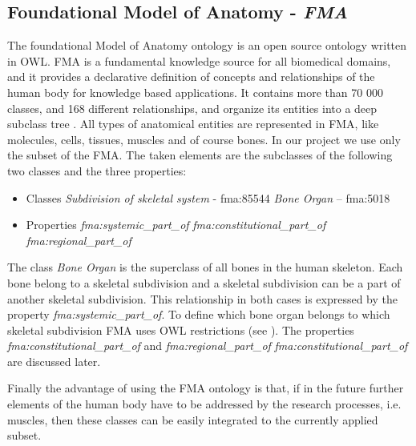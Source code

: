 \subsection{Foundational Model of Anatomy - \textit{FMA}} 

The foundational Model of Anatomy ontology is an open source ontology written in OWL. FMA is a fundamental knowledge source for all biomedical domains, and it provides a declarative definition of concepts and relationships of the human body for knowledge based applications. It contains more than 70 000 classes, and 168 different relationships, and organize its entities into a deep subclass tree \cite{Rosse2003478}. All types of anatomical entities are represented in FMA, like molecules, cells, tissues, muscles and of course bones. In our project we use only the subset of the FMA. The taken elements are the subclasses of the following two classes and the three properties: 

\begin{itemize}
	\item{Classes}
		\subitem \textit{Subdivision of skeletal system} - fma:85544 
		\subitem \textit{Bone Organ} – fma:5018
\end{itemize}

\begin{itemize}
	\item{Properties}
		\subitem \textit{fma:systemic\_part\_of}
		\subitem \textit{fma:constitutional\_part\_of}
		\subitem \textit{fma:regional\_part\_of}
\end{itemize}

The class \textit{Bone Organ} is the superclass of all bones in the human skeleton. Each bone belong to a skeletal subdivision and a skeletal subdivision can be a part of another skeletal subdivision. This relationship in both cases is expressed by the property \textit{fma:systemic\_part\_of}. To define which bone organ belongs to which skeletal subdivision FMA uses OWL restrictions (see ). The properties \textit{fma:constitutional\_part\_of} and \textit{fma:regional\_part\_of} \textit{fma:constitutional\_part\_of} are discussed later.


Finally the advantage of using the FMA ontology is that, if in the future further elements of the human body have to be addressed by the research processes, i.e. muscles, then these classes can be easily integrated to the currently applied subset.

